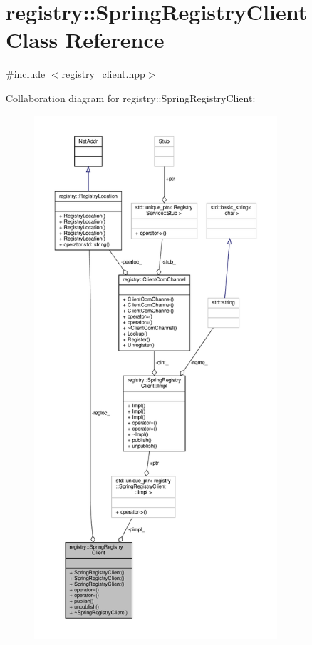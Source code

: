 \hypertarget{classregistry_1_1SpringRegistryClient}{}\section{registry\+:\+:Spring\+Registry\+Client Class Reference}
\label{classregistry_1_1SpringRegistryClient}


{\ttfamily \#include $<$registry\+\_\+client.\+hpp$>$}



Collaboration diagram for registry\+:\+:Spring\+Registry\+Client\+:\nopagebreak
\begin{figure}[H]
\begin{center}
\leavevmode
\includegraphics[height=550pt]{classregistry_1_1SpringRegistryClient__coll__graph}
\end{center}
\end{figure}
